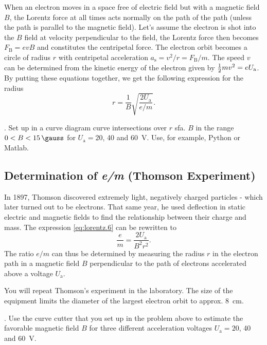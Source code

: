 \documentclass[../Elmag-labhefte-2020.tex]{subfiles}
\begin{document}
When an electron moves in a space free of electric field but with a magnetic field $B$, the Lorentz force at all times acts normally on the path of the path (unless the path is parallel to the magnetic field). Let's assume the electron is shot into the $B$ field at velocity perpendicular to the field, the Lorentz force then becomes $F_\mathrm{B} = evB$ and constitutes the centripetal force. The electron orbit becomes a circle of radius $r$ with centripetal acceleration $a_\mathrm{s} = v^2/r = F_\mathrm{B}/m$. The speed $v$ can be determined from the kinetic energy of the electron given by $\frac{1}{2} mv^2 = e U_\mathrm{a}$. By putting these equations together, we get the following expression for the radius
\begin{equation}
    r = \frac{1}{B} \sqrt{\frac{2 U_\mathrm{a}}{e/m}} .
    \label{eq:lorentz.6}
\end{equation}

{. Set up in a curve diagram curve intersections over $r$ sfa. $B$ in the range $0 < B < \SI{15}{\gauss}$ for $U_\mathrm{a} = 20$, \num{40} and \SI{60}{\volt}}. Use, for example, Python or Matlab.


\subsection{Determination of \textsl{e/m} (Thomson Experiment)}
 
In 1897, Thomson discovered
extremely light, negatively charged particles - which later turned out to be electrons. That same year, he used deflection in static electric and magnetic fields to find the relationship between their charge and mass. The expression \eqref{eq:lorentz.6} can be rewritten to
\begin{equation}
    \frac{e}{m} = \frac{2 U_\mathrm{a}} {B^2 r^2}.
    \label{eq:lorentz.7}
\end{equation}
%
The ratio $e/m$ can thus be determined by measuring the radius $r$ in the electron path in a magnetic field $B$ perpendicular to the path of electrons accelerated above a voltage $U_\mathrm{a}$.

You will repeat Thomson's experiment in the laboratory. The size of the equipment limits the diameter of the largest electron orbit to approx. \SI{8}{\cm}.

{. Use the curve cutter that you set up in the problem above to estimate the favorable magnetic field $B$ for three different acceleration voltages $U_\mathrm{a} = 20$, \num{40} and \SI{60}{\volt}.}
 
\end{document}
